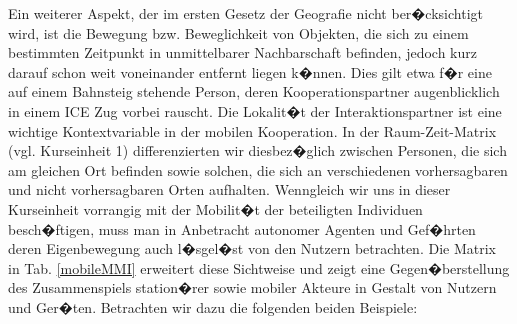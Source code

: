 Ein weiterer Aspekt, der im ersten Gesetz der Geografie nicht ber�cksichtigt wird, ist die Bewegung bzw. Beweglichkeit von Objekten, die sich zu einem bestimmten Zeitpunkt in unmittelbarer Nachbarschaft befinden, jedoch kurz darauf schon weit voneinander entfernt liegen k�nnen. Dies gilt etwa f�r eine auf einem Bahnsteig stehende Person, deren Kooperationspartner augenblicklich in einem ICE Zug vorbei rauscht. Die Lokalit�t der Interaktionspartner ist eine wichtige Kontextvariable in der mobilen Kooperation. In der Raum-Zeit-Matrix (vgl. Kurseinheit 1) differenzierten wir diesbez�glich zwischen Personen, die sich am gleichen Ort befinden sowie solchen, die sich an verschiedenen vorhersagbaren und nicht vorhersagbaren Orten aufhalten.
Wenngleich wir uns in dieser Kurseinheit vorrangig mit der Mobilit�t der beteiligten Individuen besch�ftigen, muss man in Anbetracht autonomer Agenten und Gef�hrten deren Eigenbewegung auch l�sgel�st von den Nutzern betrachten. Die Matrix in Tab. \ref{mobileMMI} erweitert diese Sichtweise und zeigt eine Gegen�berstellung des Zusammenspiels station�rer sowie mobiler Akteure in Gestalt von Nutzern und Ger�ten. Betrachten wir dazu die folgenden beiden Beispiele: 

